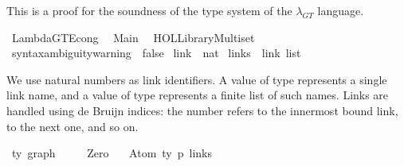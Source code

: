 %
\begin{isabellebody}%
%
%
\isadelimdocument
%
\endisadelimdocument
%
\isatagdocument
%
\isamarkuptrue%
%
\endisatagdocument
{\isafolddocument}%
%
\isadelimdocument
%
\endisadelimdocument
%
\begin{isamarkuptext}%
This is a proof for the soundness of the type system of the $\lambda_{GT}$ language.%
\end{isamarkuptext}\isamarkuptrue%
%
\isadelimtheory
%
\endisadelimtheory
%
\isatagtheory
{}\isamarkupfalse%
\ LambdaGT{\isacharunderscore}{\kern0pt}Econg\isanewline
{}\isanewline
\ \ Main\isanewline
\ \ {\isachardoublequoteopen}HOL{\isacharminus}{\kern0pt}Library{\isachardot}{\kern0pt}Multiset{\isachardoublequoteclose}\isanewline
{}%
\endisatagtheory
{\isafoldtheory}%
%
\isadelimtheory
%
\endisadelimtheory
\isanewline
\isanewline
{}\isamarkupfalse%
\ {\isacharbrackleft}{\kern0pt}{\isacharbrackleft}{\kern0pt}syntax{\isacharunderscore}{\kern0pt}ambiguity{\isacharunderscore}{\kern0pt}warning\ {\isacharequal}{\kern0pt}\ false{\isacharbrackright}{\kern0pt}{\isacharbrackright}{\kern0pt}%
\isadelimdocument
%
\endisadelimdocument
%
\isatagdocument
%
\isamarkuptrue%
%
\isamarkuptrue%
%
\endisatagdocument
{\isafolddocument}%
%
\isadelimdocument
%
\endisadelimdocument
{}\isamarkupfalse%
\ link\ {\isacharequal}{\kern0pt}\ nat\isanewline
{}\isamarkupfalse%
\ links\ {\isacharequal}{\kern0pt}\ {\isachardoublequoteopen}link\ list{\isachardoublequoteclose}%
\begin{isamarkuptext}%
We use natural numbers as link identifiers.
A value of type  represents a single link name,
and a value of type  represents a finite list of such names.
Links are handled using de Bruijn indices: the number  refers to the
innermost bound link,  to the next one, and so on.%
\end{isamarkuptext}\isamarkuptrue%
\isamarkupfalse%
\ {\isacharprime}{\kern0pt}ty\ graph\ {\isacharequal}{\kern0pt}\isanewline
\ \ \ \ Zero\isanewline
\ \ {\isacharbar}{\kern0pt}\ Atom\ {\isachardoublequoteopen}{\isacharprime}{\kern0pt}ty\ p{\isachardoublequoteclose}\ links\isanewline

\end{isabellebody}
